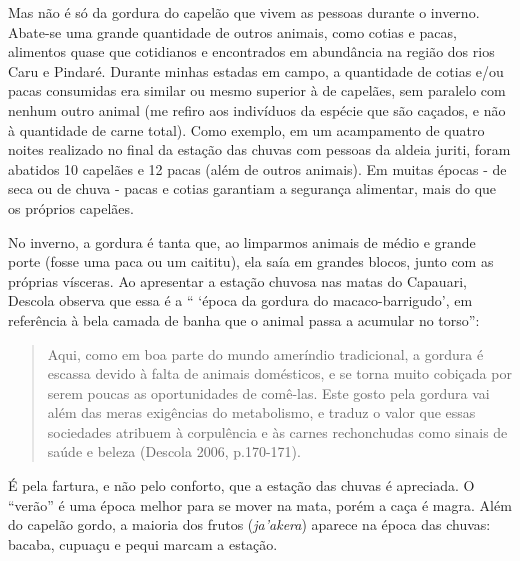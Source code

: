 Mas não é só da gordura do capelão que vivem as pessoas durante o
inverno. Abate-se uma grande quantidade de outros animais, como cotias e
pacas, alimentos quase que cotidianos e encontrados em abundância na
região dos rios Caru e Pindaré. Durante minhas estadas em campo, a
quantidade de cotias e/ou pacas consumidas era similar ou mesmo superior
à de capelães, sem paralelo com nenhum outro animal (me refiro aos
indivíduos da espécie que são caçados, e não à quantidade de carne
total). Como exemplo, em um acampamento de quatro noites realizado no
final da estação das chuvas com pessoas da aldeia juriti, foram abatidos
10 capelães e 12 pacas (além de outros animais). Em muitas épocas - de
seca ou de chuva - pacas e cotias garantiam a segurança alimentar, mais
do que os próprios capelães.

No inverno, a gordura é tanta que, ao limparmos animais de médio e
grande porte (fosse uma paca ou um caititu), ela saía em grandes blocos,
junto com as próprias vísceras. Ao apresentar a estação chuvosa nas
matas do Capauari, Descola observa que essa é a `` `época da gordura do
macaco-barrigudo', em referência à bela camada de banha que o animal
passa a acumular no torso'':

\begin{quote}
Aqui, como em boa parte do mundo ameríndio tradicional, a gordura é
escassa devido à falta de animais domésticos, e se torna muito cobiçada
por serem poucas as oportunidades de comê-las. Este gosto pela gordura
vai além das meras exigências do metabolismo, e traduz o valor que essas
sociedades atribuem à corpulência e às carnes rechonchudas como sinais
de saúde e beleza (Descola 2006, p.170-171).
\end{quote}

É pela fartura, e não pelo conforto, que a estação das chuvas é
apreciada. O ``verão'' é uma época melhor para se mover na mata, porém a
caça é magra. Além do capelão gordo, a maioria dos frutos
(\emph{ja'akera}) aparece na época das chuvas: bacaba, cupuaçu e pequi
marcam a estação.

